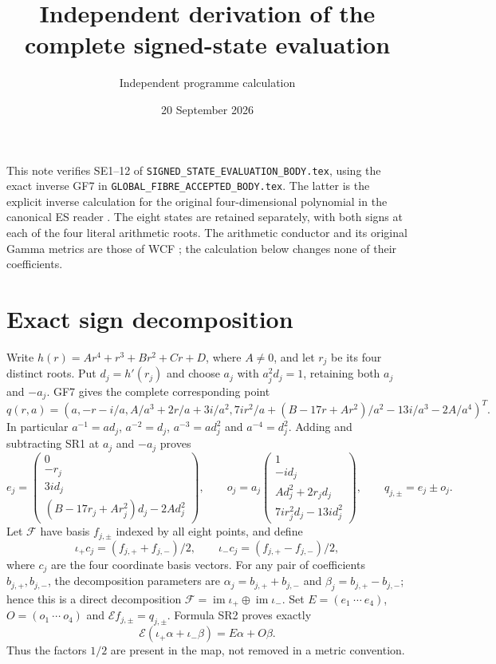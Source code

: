 \documentclass[11pt]{article}
\title{Independent derivation of the complete signed-state evaluation}
\author{Independent programme calculation}
\date{20 September 2026}
\begin{document}
\maketitle
This note verifies SE1--12 of
\texttt{SIGNED\_STATE\_EVALUATION\_BODY.tex}, using the exact
inverse GF7 in \texttt{GLOBAL\_FIBRE\_ACCEPTED\_BODY.tex}.
The latter is the explicit inverse calculation for the original
four-dimensional polynomial in the canonical ES reader \cite{ES}.
The eight states are retained separately, with both signs at each
of the four literal arithmetic roots. The arithmetic conductor
and its original Gamma metrics are those of WCF \cite{WCF};
the calculation below changes none of their coefficients.

\section{Exact sign decomposition}
Write $h(r)=Ar^4+r^3+Br^2+Cr+D$, where $A\ne0$, and let
$r_j$ be its four distinct roots. Put $d_j=h'(r_j)$ and choose
$a_j$ with $a_j^2d_j=1$, retaining both $a_j$ and $-a_j$.
GF7 gives the complete corresponding point
\[
 q(r,a)=\left(a,-r-i/a,A/a^3+2r/a+3i/a^2,
 7ir^2/a+(B-17r+Ar^2)/a^2-13i/a^3-2A/a^4\right)^T.
 \tag{SR1}
\]
In particular $a^{-1}=ad_j$, $a^{-2}=d_j$, $a^{-3}=ad_j^2$
and $a^{-4}=d_j^2$. Adding and subtracting SR1 at $a_j$ and
$-a_j$ proves
\[
 e_j=\begin{pmatrix}0\\-r_j\\3id_j\\
 (B-17r_j+Ar_j^2)d_j-2Ad_j^2\end{pmatrix},\qquad
 o_j=a_j\begin{pmatrix}1\\-id_j\\Ad_j^2+2r_jd_j\\
 7ir_j^2d_j-13id_j^2\end{pmatrix},\qquad
 q_{j,\pm}=e_j\pm o_j.
 \tag{SR2}
\]
Let $\mathcal F$ have basis $f_{j,\pm}$ indexed by all eight
points, and define
\[
 \iota_+c_j=(f_{j,+}+f_{j,-})/2,\qquad
 \iota_-c_j=(f_{j,+}-f_{j,-})/2,
\]
where $c_j$ are the four coordinate basis vectors. For any pair
of coefficients $b_{j,+},b_{j,-}$, the decomposition parameters
are $\alpha_j=b_{j,+}+b_{j,-}$ and
$\beta_j=b_{j,+}-b_{j,-}$; hence this is a direct decomposition
$\mathcal F=\operatorname{im}\iota_+\oplus\operatorname{im}\iota_-$.
Set $E=(e_1\ \cdots\ e_4)$, $O=(o_1\ \cdots\ o_4)$ and
$\mathcal Ef_{j,\pm}=q_{j,\pm}$. Formula SR2 proves exactly
\[
 \mathcal E(\iota_+\alpha+\iota_-\beta)=E\alpha+O\beta.
 \tag{SR3}
\]
Thus the factors $1/2$ are present in the map, not removed in a
metric convention.
\end{document}
